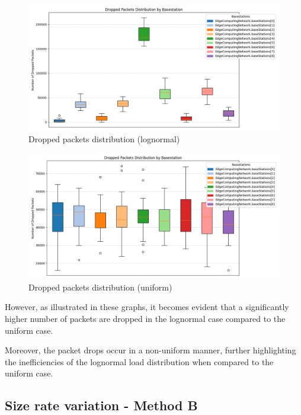 \documentclass{report}
\begin{document}
\begin{figure}[H]
    \centering
    \includegraphics[width=\textwidth]{img/plots/log_1e4_A/dropped.png}
    \caption{Dropped packets distribution (lognormal)}
\end{figure}

\begin{figure}[H]
    \centering
    \includegraphics[width=\textwidth]{img/plots/uni_1e4_A/dropped.png}
    \caption{Dropped packets distribution (uniform)}
\end{figure}

\begin{flushleft}
However, as illustrated in these graphs, it becomes evident that a significantly higher number of packets are dropped in the lognormal case compared to the uniform case.
\end{flushleft}

\begin{flushleft}
Moreover, the packet drops occur in a non-uniform manner, further highlighting the inefficiencies of the lognormal load distribution when compared to the uniform case.
\end{flushleft}

\subsection{Size rate variation - Method B}
\end{document}
